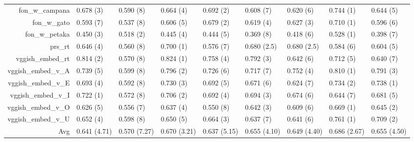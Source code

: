 \documentclass[a4paper,10pt]{article}
\begin{document}
\begin{table}[!htp]
{\begin{tabular}{rllllllll}
fon\_w\_campana&0.678 (3)&0.590 (8)&0.664 (4)&0.692 (2)&0.608 (7)&0.620 (6)&0.744 (1)&0.644 (5)\\
fon\_w\_gato&0.593 (7)&0.537 (8)&0.606 (5)&0.679 (2)&0.619 (4)&0.627 (3)&0.710 (1)&0.596 (6)\\
fon\_w\_petaka&0.450 (3)&0.518 (2)&0.445 (4)&0.444 (5)&0.369 (8)&0.418 (6)&0.528 (1)&0.398 (7)\\
prs\_rt&0.646 (4)&0.560 (8)&0.700 (1)&0.576 (7)&0.680 (2.5)&0.680 (2.5)&0.584 (6)&0.604 (5)\\
vggish\_embed\_rt&0.814 (2)&0.570 (8)&0.824 (1)&0.758 (4)&0.792 (3)&0.642 (6)&0.712 (5)&0.640 (7)\\
vggish\_embed\_v\_A&0.739 (5)&0.599 (8)&0.796 (2)&0.726 (6)&0.717 (7)&0.752 (4)&0.810 (1)&0.791 (3)\\
vggish\_embed\_v\_E&0.693 (4)&0.592 (8)&0.730 (3)&0.692 (5)&0.671 (6)&0.624 (7)&0.734 (2)&0.738 (1)\\
vggish\_embed\_v\_I&0.722 (1)&0.572 (8)&0.706 (2)&0.692 (4)&0.694 (3)&0.674 (6)&0.644 (7)&0.681 (5)\\
vggish\_embed\_v\_O&0.626 (5)&0.556 (7)&0.637 (4)&0.550 (8)&0.642 (3)&0.609 (6)&0.669 (1)&0.645 (2)\\
vggish\_embed\_v\_U&0.652 (4)&0.598 (8)&0.650 (5)&0.664 (3)&0.637 (7)&0.641 (6)&0.761 (1)&0.709 (2)\\
\Xhline{2\arrayrulewidth}
Avg&0.641 (4.71)&0.570 (7.27)&0.670 (3.21)&0.637 (5.15)&0.655 (4.10)&0.649 (4.40)&0.686 (2.67)&0.655 (4.50)\\
\end{tabular}}
\end{table}
\end{document}

